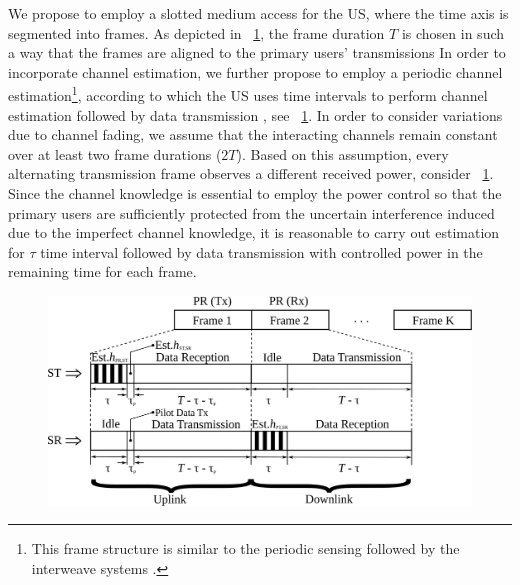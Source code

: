 We propose to employ a slotted medium access for the US, where the time axis is segmented into frames. As depicted in \figurename~\ref{fig:fs}, the frame duration $T$ is chosen in such a way that the frames are aligned to the primary users' transmissions In order to incorporate channel estimation, we further propose to employ a periodic channel estimation\footnote{This frame structure is similar to the periodic sensing followed by the interweave systems \cite{Liang08}.}, according to which the US uses time intervals  to perform channel estimation followed by data transmission , see \figurename~\ref{fig:fs}. In order to consider variations due to channel fading, we assume that the interacting channels remain constant over at least two frame durations ($2T$). Based on this assumption, every alternating transmission frame observes a different received power, consider \figurename~\ref{fig:fs}. Since the channel knowledge is essential to employ the power control so that the primary users are sufficiently protected from the uncertain interference induced due to the imperfect channel knowledge, it is reasonable to carry out estimation for $\tau$ time interval followed by data transmission with controlled power in the remaining time for each frame. %
\begin{figure}[!t]
\vspace{\figmara}
\centering
\includegraphics[width = \figscalett]{figures/Frame_Structure_V2}
\vspace{\figmarc}
\caption{} 
\label{fig:fs}
\vspace{\figmarb}
\end{figure}

